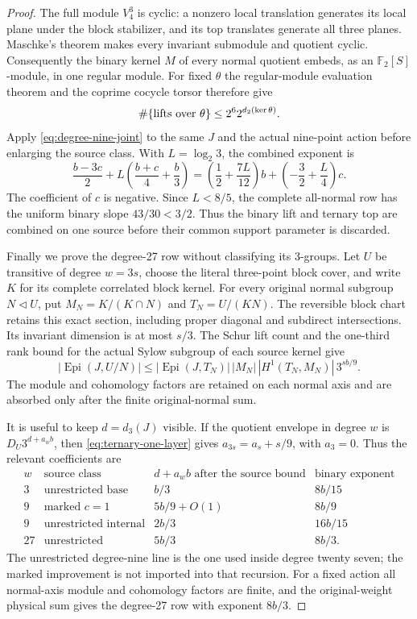 \begin{proof}
The full module $V_4^3$ is cyclic: a nonzero local translation generates
its local plane under the block stabilizer, and its top translates generate
all three planes.  Maschke's theorem makes every invariant submodule and
quotient cyclic.  Consequently the binary kernel $M$ of every normal
quotient embeds, as an $\mathbb F_2[S]$-module, in one regular module.
For fixed $\theta$ the regular-module evaluation theorem and the coprime
cocycle torsor therefore give
\[
 \#\{\hbox{lifts over }\theta\}
 \leq 2^6 2^{d_2(\ker\theta)}.
\]
Apply \eqref{eq:degree-nine-joint} to the same $J$ and the actual
nine-point action before enlarging the source class.  With
$L=\log_2 3$, the combined exponent is
\[
 \frac{b-3c}{2}+L\left(\frac{b+c}{4}+\frac b3\right)
 =\left(\frac12+\frac{7L}{12}\right)b
   +\left(-\frac32+\frac L4\right)c.
\]
The coefficient of $c$ is negative.  Since $L<8/5$, the complete
all-normal row has the uniform binary slope $43/30<3/2$.  Thus the
binary lift and ternary top are combined on one source before their common
support parameter is discarded.

Finally we prove the degree-27 row without classifying its $3$-groups.
Let $U$ be transitive of degree $w=3s$, choose the literal three-point
block cover, and write $K$ for its complete correlated block kernel.  For
every original normal subgroup $N\triangleleft U$, put
$M_N=K/(K\cap N)$ and $T_N=U/(KN)$.  The reversible block chart retains
this exact section, including proper diagonal and subdirect intersections.
Its invariant dimension is at most $s/3$.  The Schur lift count and the
one-third rank bound for the actual Sylow subgroup of each source kernel give
\begin{equation}\label{eq:ternary-one-layer}
 |\operatorname{Epi}(J,U/N)|
 \leq |\operatorname{Epi}(J,T_N)|\,
       |M_N|\,|H^1(T_N,M_N)|\,3^{sb/9}.
\end{equation}
The module and cohomology factors are retained on each normal axis and are
absorbed only after the finite original-normal sum.

It is useful to keep $d=d_3(J)$ visible.  If the quotient envelope in degree
$w$ is $D_U3^{d+a_wb}$, then \eqref{eq:ternary-one-layer} gives
$a_{3s}=a_s+s/9$, with $a_3=0$.  Thus the relevant coefficients are
\[
\begin{array}{c|c|c|c}
 w&\text{source class}&d+a_wb\text{ after the source bound}
   &\text{binary exponent}\\ \hline
 3&\text{unrestricted base}&b/3&8b/15\\
 9&\text{marked }c=1&5b/9+O(1)&8b/9\\
 9&\text{unrestricted internal}&2b/3&16b/15\\
 27&\text{unrestricted}&5b/3&8b/3.
\end{array}
\]
The unrestricted degree-nine line is the one used inside degree twenty
seven; the marked improvement is not imported into that recursion.  For a
fixed action all normal-axis module and cohomology factors are finite, and
the original-weight physical sum gives the degree-27 row with exponent
$8b/3$.
\end{proof}

